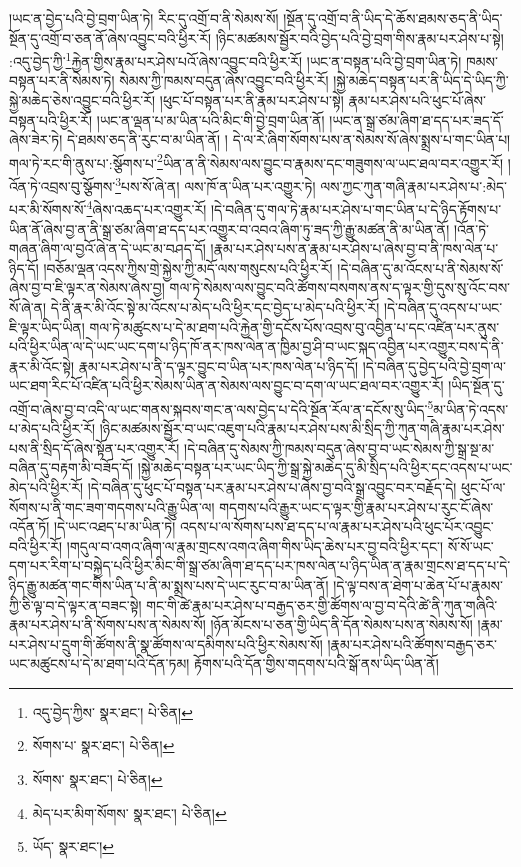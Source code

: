 །ཡང་ན་བྱེད་པའི་བྱེ་བྲག་ཡིན་ཏེ། རིང་དུ་འགྲོ་བ་ནི་སེམས་སོ། །སྔོན་དུ་འགྲོ་བ་ནི་ཡིད་དེ་ཆོས་ཐམས་ཅད་ནི་ཡིད་སྔོན་དུ་འགྲོ་བ་ཅན་ནོ་ཞེས་འབྱུང་བའི་ཕྱིར་རོ། །ཉིང་མཚམས་སྦྱོར་བའི་བྱེད་པའི་བྱེ་བྲག་གིས་རྣམ་པར་ཤེས་པ་སྟེ། :འདུ་བྱེད་ཀྱི་\footnote{འདུ་བྱེད་ཀྱིས་  སྣར་ཐང་།  པེ་ཅིན། }རྐྱེན་གྱིས་རྣམ་པར་ཤེས་པའོ་ཞེས་འབྱུང་བའི་ཕྱིར་རོ། །ཡང་ན་བསྟན་པའི་བྱེ་བྲག་ཡིན་ཏེ། ཁམས་བསྟན་པར་ནི་སེམས་ཏེ། སེམས་ཀྱི་ཁམས་བདུན་ཞེས་འབྱུང་བའི་ཕྱིར་རོ། །སྐྱེ་མཆེད་བསྟན་པར་ནི་ཡིད་དེ་ཡིད་ཀྱི་སྐྱེ་མཆེད་ཅེས་འབྱུང་བའི་ཕྱིར་རོ། །ཕུང་པོ་བསྟན་པར་ནི་རྣམ་པར་ཤེས་པ་སྟེ། རྣམ་པར་ཤེས་པའི་ཕུང་པོ་ཞེས་བསྟན་པའི་ཕྱིར་རོ། །ཡང་ན་ལྡན་པ་མ་ཡིན་པའི་མིང་གི་བྱེ་བྲག་ཡིན་ནོ། །ཡང་ན་སྒྲ་ཙམ་ཞིག་ཐ་དད་པར་ཟད་དོ་ཞེས་ཟེར་ཏེ། དེ་ཐམས་ཅད་ནི་རུང་བ་མ་ཡིན་ནོ། །
དེ་ལ་རེ་ཞིག་སོགས་པས་ན་སེམས་སོ་ཞེས་སྨྲས་པ་གང་ཡིན་པ། གལ་ཏེ་རང་གི་ནུས་པ་:སྩོགས་པ་\footnote{སོགས་པ་  སྣར་ཐང་།  པེ་ཅིན། }ཡིན་ན་ནི་སེམས་ལས་བྱུང་བ་རྣམས་དང་གཟུགས་ལ་ཡང་ཐལ་བར་འགྱུར་རོ། །འོན་ཏེ་འབྲས་བུ་སྩོགས་\footnote{སོགས་  སྣར་ཐང་།  པེ་ཅིན། }པས་སོ་ཞེ་ན། ལས་ཁོ་ན་ཡིན་པར་འགྱུར་ཏེ། ལས་ཀྱང་ཀུན་གཞི་རྣམ་པར་ཤེས་པ་:མེད་པར་མི་སོགས་སོ་\footnote{མེད་པར་མིག་སོགས་  སྣར་ཐང་།  པེ་ཅིན། }ཞེས་འཆད་པར་འགྱུར་རོ། །དེ་བཞིན་དུ་གལ་ཏེ་རྣམ་པར་ཤེས་པ་གང་ཡིན་པ་དེ་ཉིད་རྟོགས་པ་ཡིན་ནོ་ཞེས་བྱ་ན་ནི་སྒྲ་ཙམ་ཞིག་ཐ་དད་པར་འགྱུར་བ་འབའ་ཞིག་ཏུ་ཟད་ཀྱི་རྒྱུ་མཚན་ནི་མ་ཡིན་ནོ། །འོན་ཏེ་གཞན་ཞིག་ལ་བྱའོ་ཞེ་ན་དེ་ཡང་མ་བཤད་དོ། །རྣམ་པར་ཤེས་པས་ན་རྣམ་པར་ཤེས་པ་ཞེས་བྱ་བ་ནི་ཁས་ལེན་པ་ཉིད་དོ། །བཅོམ་ལྡན་འདས་ཀྱིས་གྲེ་སྐྱེས་ཀྱི་མདོ་ལས་གསུངས་པའི་ཕྱིར་རོ། །དེ་བཞིན་དུ་མ་འོངས་པ་ནི་སེམས་སོ་ཞེས་བྱ་བ་ཇི་ལྟར་ན་སེམས་ཞེས་བྱ། གལ་ཏེ་སེམས་ལས་བྱུང་བའི་ཚོགས་བསགས་ནས་ད་ལྟར་གྱི་དུས་སུ་འོང་བས་སོ་ཞེ་ན། དེ་ནི་རྣར་མི་འོང་སྟེ་མ་འོངས་པ་མེད་པའི་ཕྱིར་དང་བྱེད་པ་མེད་པའི་ཕྱིར་རོ། །དེ་བཞིན་དུ་འདས་པ་ཡང་ཇི་ལྟར་ཡིད་ཡིན། གལ་ཏེ་མཚུངས་པ་དེ་མ་ཐག་པའི་རྐྱེན་གྱི་དངོས་པོས་འབྲས་བུ་འབྱིན་པ་དང་འཛིན་པར་ནུས་པའི་ཕྱིར་ཡིན་ལ་དེ་ཡང་ཡང་དག་པ་ཉིད་ཁོ་ནར་ཁས་ལེན་ན་ཁྱིམ་བྱ་ཤི་བ་ཡང་སྐད་འབྱིན་པར་འགྱུར་བས་དེ་ནི་རྣར་མི་འོང་སྟེ། རྣམ་པར་ཤེས་པ་ནི་ད་ལྟར་བྱུང་བ་ཡིན་པར་ཁས་ལེན་པ་ཉིད་དོ། །དེ་བཞིན་དུ་བྱེད་པའི་བྱེ་བྲག་ལ་ཡང་ཐག་རིང་པོ་འཛིན་པའི་ཕྱིར་སེམས་ཡིན་ན་སེམས་ལས་བྱུང་བ་དག་ལ་ཡང་ཐལ་བར་འགྱུར་རོ། །ཡིད་སྔོན་དུ་འགྲོ་བ་ཞེས་བྱ་བ་འདི་ལ་ཡང་གནས་སྐབས་གང་ན་ལས་བྱེད་པ་དེའི་སྔོན་རོལ་ན་དངོས་སུ་ཡིད་\footnote{ཡོད་  སྣར་ཐང་། }མ་ཡིན་ཏེ་འདས་པ་མེད་པའི་ཕྱིར་རོ། །ཉིང་མཚམས་སྦྱོར་བ་ཡང་འཇུག་པའི་རྣམ་པར་ཤེས་པས་མི་སྲིད་ཀྱི་ཀུན་གཞི་རྣམ་པར་ཤེས་པས་ནི་སྲིད་དོ་ཞེས་སྟོན་པར་འགྱུར་རོ། །དེ་བཞིན་དུ་སེམས་ཀྱི་ཁམས་བདུན་ཞེས་བྱ་བ་ཡང་སེམས་ཀྱི་སྒྲ་སྔ་མ་བཞིན་དུ་བརྟག་མི་བཟོད་དོ། །སྐྱེ་མཆེད་བསྟན་པར་ཡང་ཡིད་ཀྱི་སྒྲ་སྐྱེ་མཆེད་དུ་མི་སྲིད་པའི་ཕྱིར་དང་འདས་པ་ཡང་མེད་པའི་ཕྱིར་རོ། །དེ་བཞིན་དུ་ཕུང་པོ་བསྟན་པར་རྣམ་པར་ཤེས་པ་ཞེས་བྱ་བའི་སྒྲ་འབྱུང་བར་བརྗོད་དེ། ཕུང་པོ་ལ་སོགས་པ་ནི་གང་ཟག་གདགས་པའི་རྒྱུ་ཡིན་ལ། གདགས་པའི་རྒྱུར་ཡང་ད་ལྟར་གྱི་རྣམ་པར་ཤེས་པ་རུང་ངོ་ཞེས་འདོན་ཏོ། །དེ་ཡང་འཐད་པ་མ་ཡིན་ཏེ། འདས་པ་ལ་སོགས་པས་ཐ་དད་པ་ལ་རྣམ་པར་ཤེས་པའི་ཕུང་པོར་འབྱུང་བའི་ཕྱིར་རོ། །གདུལ་བ་འགའ་ཞིག་ལ་རྣམ་གྲངས་འགའ་ཞིག་གིས་ཡིད་ཆེས་པར་བྱ་བའི་ཕྱིར་དང་། སོ་སོ་ཡང་དག་པར་རིག་པ་བསྐྱེད་པའི་ཕྱིར་མིང་གི་སྒྲ་ཙམ་ཞིག་ཐ་དད་པར་ཁས་ལེན་པ་ཉིད་ཡིན་ན་རྣམ་གྲངས་ཐ་དད་པ་དེ་ཉིད་རྒྱུ་མཚན་གང་གིས་ཡིན་པ་ནི་མ་སྨྲས་པས་དེ་ཡང་རུང་བ་མ་ཡིན་ནོ། །དེ་ལྟ་བས་ན་ཐེག་པ་ཆེན་པོ་པ་རྣམས་ཀྱི་ཅི་ལྟ་བ་དེ་ལྟར་ན་བཟང་སྟེ། གང་གི་ཚེ་རྣམ་པར་ཤེས་པ་བརྒྱད་ཅར་གྱི་ཚོགས་ལ་བྱ་བ་དེའི་ཚེ་ནི་ཀུན་གཞིའི་རྣམ་པར་ཤེས་པ་ནི་སོགས་པས་ན་སེམས་སོ། །ཉོན་མོངས་པ་ཅན་གྱི་ཡིད་ནི་དོན་སེམས་པས་ན་སེམས་སོ། །རྣམ་པར་ཤེས་པ་དྲུག་གི་ཚོགས་ནི་སྣ་ཚོགས་ལ་དམིགས་པའི་ཕྱིར་སེམས་སོ། །རྣམ་པར་ཤེས་པའི་ཚོགས་བརྒྱད་ཅར་ཡང་མཚུངས་པ་དེ་མ་ཐག་པའི་དོན་ཏམ། རྟོགས་པའི་དོན་གྱིས་གདགས་པའི་སྒོ་ནས་ཡིད་ཡིན་ནོ། 